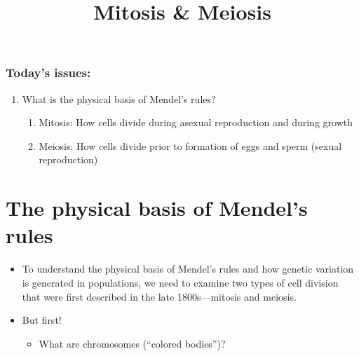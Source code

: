 





\title[Mitosis \& Meiosis]{Mitosis \& Meiosis}
\date{}



\maketitle


\begin{frame}[t]
\frametitle{Today's issues:}
\begin{enumerate}
    \item What is the physical basis of Mendel's rules?
        \begin{enumerate}
            \item Mitosis: How cells divide during asexual reproduction and
                during growth
            \item Meiosis: How cells divide prior to formation of eggs and
                sperm (sexual reproduction)
        \end{enumerate}
\end{enumerate}
\end{frame}


\section{The physical basis of Mendel's rules}

\begin{frame}[t]
    \begin{itemize}
        \item To understand the physical basis of Mendel's rules and how
            genetic variation is generated in populations, we need to examine
            two types of cell division that were first described in the late
            1800s---mitosis and meiosis. 

            \vspace{5mm}
        \item But first!
            \begin{itemize}
                \item What are chromosomes (``colored bodies'')?
            \end{itemize}
    \end{itemize}
\end{frame}

